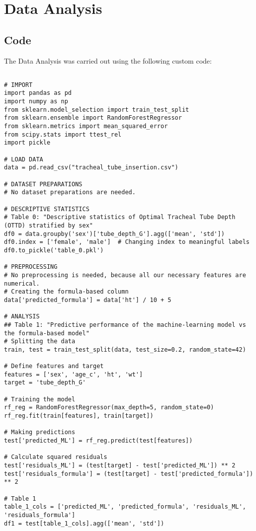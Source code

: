 \documentclass[11pt]{article}
\begin{document}
\section{Data Analysis}
\subsection{{Code}}
The Data Analysis was carried out using the following custom code:

\begin{verbatim}

# IMPORT
import pandas as pd
import numpy as np
from sklearn.model_selection import train_test_split
from sklearn.ensemble import RandomForestRegressor
from sklearn.metrics import mean_squared_error
from scipy.stats import ttest_rel
import pickle

# LOAD DATA
data = pd.read_csv("tracheal_tube_insertion.csv")

# DATASET PREPARATIONS
# No dataset preparations are needed.

# DESCRIPTIVE STATISTICS
# Table 0: "Descriptive statistics of Optimal Tracheal Tube Depth (OTTD) stratified by sex"
df0 = data.groupby('sex')['tube_depth_G'].agg(['mean', 'std'])
df0.index = ['female', 'male']  # Changing index to meaningful labels
df0.to_pickle('table_0.pkl')

# PREPROCESSING 
# No preprocessing is needed, because all our necessary features are numerical.
# Creating the formula-based column
data['predicted_formula'] = data['ht'] / 10 + 5

# ANALYSIS 
## Table 1: "Predictive performance of the machine-learning model vs the formula-based model"
# Splitting the data
train, test = train_test_split(data, test_size=0.2, random_state=42)

# Define features and target
features = ['sex', 'age_c', 'ht', 'wt']
target = 'tube_depth_G'

# Training the model
rf_reg = RandomForestRegressor(max_depth=5, random_state=0)
rf_reg.fit(train[features], train[target])

# Making predictions
test['predicted_ML'] = rf_reg.predict(test[features])

# Calculate squared residuals
test['residuals_ML'] = (test[target] - test['predicted_ML']) ** 2
test['residuals_formula'] = (test[target] - test['predicted_formula']) ** 2

# Table 1
table_1_cols = ['predicted_ML', 'predicted_formula', 'residuals_ML', 'residuals_formula']
df1 = test[table_1_cols].agg(['mean', 'std'])


\end{verbatim}
\end{document}
